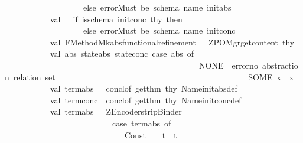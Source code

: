 \begin{isabellebody}
\ \ \ \ \ \ \ \ \ \ \ \ \ \ \ \ \ \ \ else\ error{\isacharparenleft}{\isachardoublequote}Must\ be\ schema\ name{\isacharcolon}\ {\isachardoublequote}{\isacharcircum}init{\isacharunderscore}abs{\isacharparenright}\isanewline
\ \ \ \ \ \ \ \ \ \ \ val\ {\isacharunderscore}\ {\isacharequal}\ if\ is{\isacharunderscore}schema\ init{\isacharunderscore}conc\ thy\ then\ {\isacharparenleft}{\isacharparenright}\isanewline
\ \ \ \ \ \ \ \ \ \ \ \ \ \ \ \ \ \ \ else\ error{\isacharparenleft}{\isachardoublequote}Must\ be\ schema\ name{\isacharcolon}\ {\isachardoublequote}{\isacharcircum}init{\isacharunderscore}conc{\isacharparenright}\isanewline
\ \ \ \ \ \ \ \ \ \ \ val\ FMethod{\isachardot}Mk{\isacharbraceleft}abs{\isacharcomma}functional{\isacharunderscore}refinement{\isacharbraceright}\ \ {\isacharequal}\ ZPO{\isacharunderscore}Mgr{\isachardot}get{\isacharunderscore}content\ thy\isanewline
\ \ \ \ \ \ \ \ \ \ \ val\ {\isacharparenleft}abs{\isacharcomma}\ state{\isacharunderscore}abs{\isacharcomma}\ state{\isacharunderscore}conc{\isacharparenright}{\isacharequal}\ case\ abs\ of\ \isanewline
\ \ \ \ \ \ \ \ \ \ \ \ \ \ \ \ \ \ \ \ \ \ \ \ \ \ \ \ \ \ \ \ \ \ \ \ \ \ \ \ \ \ \ \ \ \ \ NONE\ {\isacharequal}{\isachargreater}\ error{\isachardoublequote}no\ abstraction\ relation\ set{\isacharbang}{\isachardoublequote}\isanewline
\ \ \ \ \ \ \ \ \ \ \ \ \ \ \ \ \ \ \ \ \ \ \ \ \ \ \ \ \ \ \ \ \ \ \ \ \ \ \ \ \ \ \ \ \ {\isacharbar}\ SOME\ x\ {\isacharequal}{\isachargreater}\ x\isanewline
\ \ \ \ \ \ \ \ \ \ \ val\ term{\isacharunderscore}abs\ \ {\isacharequal}\ concl{\isacharunderscore}of\ {\isacharparenleft}get{\isacharunderscore}thm\ thy\ {\isacharparenleft}Name{\isacharparenleft}init{\isacharunderscore}abs{\isacharcircum}{\isachardoublequote}{\isacharunderscore}def{\isachardoublequote}{\isacharparenright}{\isacharparenright}{\isacharparenright}\ \isanewline
\ \ \ \ \ \ \ \ \ \ \ val\ term{\isacharunderscore}conc\ {\isacharequal}\ concl{\isacharunderscore}of\ {\isacharparenleft}get{\isacharunderscore}thm\ thy\ {\isacharparenleft}Name{\isacharparenleft}init{\isacharunderscore}conc{\isacharcircum}{\isachardoublequote}{\isacharunderscore}def{\isachardoublequote}{\isacharparenright}{\isacharparenright}{\isacharparenright}\ \isanewline
\ \ \ \ \ \ \ \ \ \ \ val\ term{\isacharunderscore}abs\ \ {\isacharequal}\ ZEncoder{\isachardot}strip{\isacharunderscore}Binder\isanewline
\ \ \ \ \ \ \ \ \ \ \ \ \ \ \ \ \ \ \ \ \ \ \ \ \ \ {\isacharparenleft}case\ term{\isacharunderscore}abs\ of\isanewline
\ \ \ \ \ \ \ \ \ \ \ \ \ \ \ \ \ \ \ \ \ \ \ \ \ \ \ \ \ Const{\isacharparenleft}{\isachardoublequote}{\isacharequal}{\isacharequal}{\isachardoublequote}{\isacharcomma}{\isacharunderscore}{\isacharparenright}\ {\isachardollar}\ {\isacharunderscore}\ {\isachardollar}\ t\ {\isacharequal}{\isachargreater}\ t\isanewline

\end{isabellebody}
